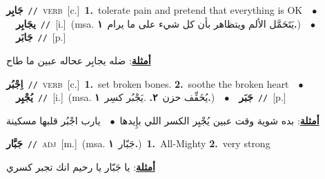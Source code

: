 \documentclass[10pt,a4paper,twoside]{article} %
\begin{document}
\begin{multicols}{2}
{{\setlength\topsep{0pt}\textbf{\foreignlanguage{arabic}{جَابِر}}\ {\color{gray}\texttt{//}\color{black}}\ \textsc{verb}\ [c.]\ \textbf{1.}~tolerate pain and pretend that everything is OK\ \ $\bullet$\ \ \setlength\topsep{0pt}\textbf{\foreignlanguage{arabic}{يجَابِر}}\ {\color{gray}\texttt{//}\color{black}}\ [i.]\ \color{gray}(msa. \foreignlanguage{arabic}{يَتَحَمَّل الألم ويتظاهر بأن كل شيء على ما يرام}~\foreignlanguage{arabic}{\textbf{١.}})\color{black}\ \ $\bullet$\ \ \setlength\topsep{0pt}\textbf{\foreignlanguage{arabic}{جَابَر}}\ {\color{gray}\texttt{//}\color{black}}\ [p.]\  \begin{flushright}\color{gray}\foreignlanguage{arabic}{\textbf{\underline{\foreignlanguage{arabic}{أمثلة}}}: ضله يجابِر عحاله عبين ما طاح}\end{flushright}\color{black}} \vspace{2mm}

{\setlength\topsep{0pt}\textbf{\foreignlanguage{arabic}{اِجْبُر}}\ {\color{gray}\texttt{//}\color{black}}\ \textsc{verb}\ [c.]\ \textbf{1.}~set broken bones.  \textbf{2.}~soothe the broken heart\ \ $\bullet$\ \ \setlength\topsep{0pt}\textbf{\foreignlanguage{arabic}{يُجْبِر}}\ {\color{gray}\texttt{//}\color{black}}\ [i.]\ \color{gray}(msa. \foreignlanguage{arabic}{يُخَفِّف حزن}~\foreignlanguage{arabic}{\textbf{٢.}}  .\foreignlanguage{arabic}{يَجْبُر كسِر}~\foreignlanguage{arabic}{\textbf{١.}})\color{black}\ \ $\bullet$\ \ \setlength\topsep{0pt}\textbf{\foreignlanguage{arabic}{جَبَر}}\ {\color{gray}\texttt{//}\color{black}}\ [p.]\  \begin{flushright}\color{gray}\foreignlanguage{arabic}{\textbf{\underline{\foreignlanguage{arabic}{أمثلة}}}: بده شوية وقت عبين يُجْبِر الكسر اللي بإِيدها\ $\bullet$\ \  يارب اجْبُر قلبها مسكينة}\end{flushright}\color{black}} \vspace{2mm}

{\setlength\topsep{0pt}\textbf{\foreignlanguage{arabic}{جَبَّار}}\ {\color{gray}\texttt{//}\color{black}}\ \textsc{adj}\ [m.]\ \color{gray}(msa. \foreignlanguage{arabic}{جَبّار}~\foreignlanguage{arabic}{\textbf{١.}})\color{black}\ \textbf{1.}~All-Mighty  \textbf{2.}~very strong\  \begin{flushright}\color{gray}\foreignlanguage{arabic}{\textbf{\underline{\foreignlanguage{arabic}{أمثلة}}}: يا جَبّار يا رحيم انك تجبر كسري}\end{flushright}\color{black}} \vspace{2mm}

}
\end{multicols}
\end{document}
